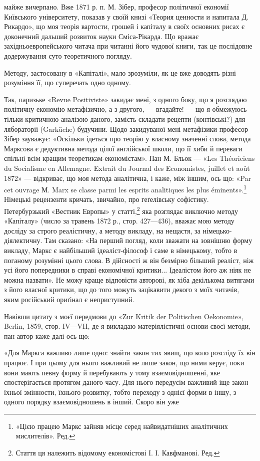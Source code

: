 майже вичерпано. Вже 1871 р. п. М. Зібер, професор політичної
економії Київського університету, показав у своїй книзі «Теория
ценности и напитала Д. Рикардо», що моя теорія вартости, грошей
і капіталу в своїх основних рисах є доконечний дальший
розвиток науки Сміса-Рікарда. Що вражає західньоевропейського
читача при читанні його чудової книги, так це послідовне
додержування суто теоретичного погляду.

Методу, застосовану в «Капіталі», мало зрозуміли, як це вже
доводять різні розуміння її, що суперечать одно одному.

Так, паризьке «Revue Positiviste» закидає мені, з одного боку,
що я розглядаю політичну економію метафізично, а з другого, —
вгадайте! — що я обмежуюсь тільки критичною аналізою даного,
замість складати рецепти (контівські?) для лябораторії (Garküche)
будучини. Щодо закидуваної мені метафізики професор Зібер зауважує:
«Оскільки ідеться про теорію у власному значенні слова,
метода Марксова є дедуктивна метода цілої англійської школи,
що її хиби й переваги спільні всім кращим теоретикам-економістам».
Пан М. Бльок — «Les Théoriciens du Socialisme en Allemagne.
Extrait du Journal des Economistes, juillet et août 1872» —
відкриває, що моя метода аналітична, і каже, між іншим, ось що:
«Par cet ouvrage М. Marx se classe parmi les esprits analitiques les
plus éminents».\footnote*{
«Цією працею Маркс зайняв місце серед найвидатніших аналітичних
мислителів». Ред.
} Німецькі рецензенти кричать, звичайно, про
геґелівську софістику. Петербурзький «Вестник Европы» у
статті,\footnote*{
Стаття ця належить відомому економістові І. І. Кавфманові. Ред.
} яка розглядає виключно методу «Капіталу» (число за
травень 1872 р., стор. 427—436), вважає мою методу досліду за
строго реалістичну, а методу викладу, на нещастя, за німецько-діялектичну.
Там сказано: «На перший погляд, коли зважати на
зовнішню форму викладу, Маркс є найбільший ідеаліст-філософ
і саме в німецькому, тобто в поганому розумінні цього слова.
В дійсності ж він безмірно більший реаліст, ніж усі його попередники
в справі економічної критики... Ідеалістом його аж ніяк не
можна назвати». Не можу краще відповісти авторові, як хіба
декількома витягами з його власної критики, що до того можуть
зацікавити декого з моїх читачів, яким російський ориґінал є
неприступний.

Навівши цитату з моєї передмови до «Zur Kritik der Politischen
Oekonomie», Berlin, 1859, стор. IV—VII, де я викладаю
матеріялістичні основи своєї методи, пан автор каже далі ось що:

«Для Маркса важливо лише одно: знайти закон тих явищ, що
коло розсліду їх він працює. І при цьому для нього важливий не
лише закон, що ними керує, поки вони мають певну форму й перебувають
у тому взаємовідношенні, яке спостерігається протягом
даного часу. Для нього передусім важливий іще закон їхньої
змінности, їхнього розвитку, тобто переходу з однієї форми в
іншу, з одного порядку взаємовідношень в інший. Скоро він уже
